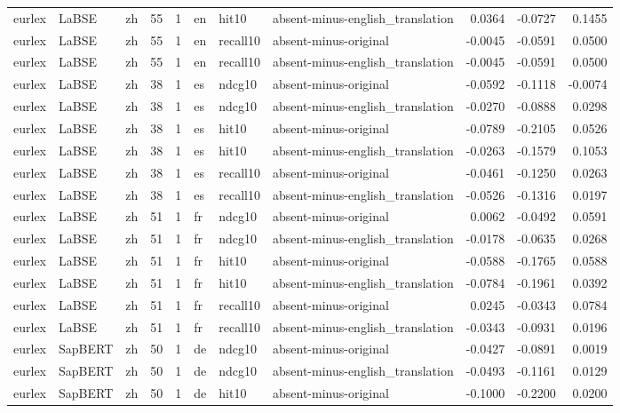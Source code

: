 \begin{tabular}{lllrrlllrrr}
eurlex & LaBSE & zh & 55 & 1 & en & hit10 & absent-minus-english\_translation & 0.0364 & -0.0727 & 0.1455 \\
eurlex & LaBSE & zh & 55 & 1 & en & recall10 & absent-minus-original & -0.0045 & -0.0591 & 0.0500 \\
eurlex & LaBSE & zh & 55 & 1 & en & recall10 & absent-minus-english\_translation & -0.0045 & -0.0591 & 0.0500 \\
eurlex & LaBSE & zh & 38 & 1 & es & ndcg10 & absent-minus-original & -0.0592 & -0.1118 & -0.0074 \\
eurlex & LaBSE & zh & 38 & 1 & es & ndcg10 & absent-minus-english\_translation & -0.0270 & -0.0888 & 0.0298 \\
eurlex & LaBSE & zh & 38 & 1 & es & hit10 & absent-minus-original & -0.0789 & -0.2105 & 0.0526 \\
eurlex & LaBSE & zh & 38 & 1 & es & hit10 & absent-minus-english\_translation & -0.0263 & -0.1579 & 0.1053 \\
eurlex & LaBSE & zh & 38 & 1 & es & recall10 & absent-minus-original & -0.0461 & -0.1250 & 0.0263 \\
eurlex & LaBSE & zh & 38 & 1 & es & recall10 & absent-minus-english\_translation & -0.0526 & -0.1316 & 0.0197 \\
eurlex & LaBSE & zh & 51 & 1 & fr & ndcg10 & absent-minus-original & 0.0062 & -0.0492 & 0.0591 \\
eurlex & LaBSE & zh & 51 & 1 & fr & ndcg10 & absent-minus-english\_translation & -0.0178 & -0.0635 & 0.0268 \\
eurlex & LaBSE & zh & 51 & 1 & fr & hit10 & absent-minus-original & -0.0588 & -0.1765 & 0.0588 \\
eurlex & LaBSE & zh & 51 & 1 & fr & hit10 & absent-minus-english\_translation & -0.0784 & -0.1961 & 0.0392 \\
eurlex & LaBSE & zh & 51 & 1 & fr & recall10 & absent-minus-original & 0.0245 & -0.0343 & 0.0784 \\
eurlex & LaBSE & zh & 51 & 1 & fr & recall10 & absent-minus-english\_translation & -0.0343 & -0.0931 & 0.0196 \\
eurlex & SapBERT & zh & 50 & 1 & de & ndcg10 & absent-minus-original & -0.0427 & -0.0891 & 0.0019 \\
eurlex & SapBERT & zh & 50 & 1 & de & ndcg10 & absent-minus-english\_translation & -0.0493 & -0.1161 & 0.0129 \\
eurlex & SapBERT & zh & 50 & 1 & de & hit10 & absent-minus-original & -0.1000 & -0.2200 & 0.0200 \\

\end{tabular}

